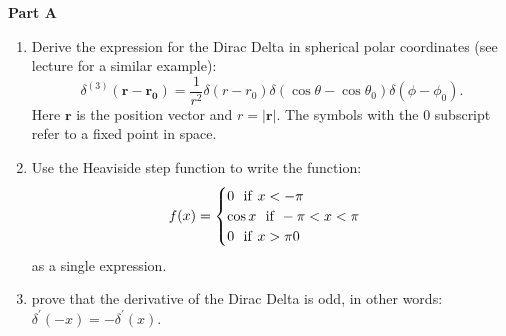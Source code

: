 \documentclass[fleqn]{article}
\begin{document}
  \textbf{Part A}
  \begin{enumerate}
    \item  Derive the expression for the Dirac Delta in spherical polar coordinates (see lecture for a similar example): 
      $$
      \delta^{(3)}(\mathbf{r}-\mathbf{r_0})=\frac{1}{r^2} \delta(r - r_0) \delta(\cos \theta - \cos \theta_0) \delta(\phi - \phi_0).
      $$
    Here $\mathbf{r}$ is the position vector and $r=|\mathbf{r}|$. The symbols with the 0 subscript refer to a fixed point in space. 

    \item  Use the Heaviside step function to write the function: 
      $$
      f(x)= 
      \begin{cases}
      0 ~~{\rm  if}~x<-\pi \\
      \cos x ~~{\rm  if}~-\pi<x<\pi \\
      0 ~~{\rm  if}~x>\pi0 \\
      
      \end{cases}
      $$
    as a single expression.  


    \item prove that the derivative of the Dirac Delta is odd, in other words: $\delta^\prime(-x)=-\delta^\prime(x)$. 
  \end{enumerate}
\end{document}
